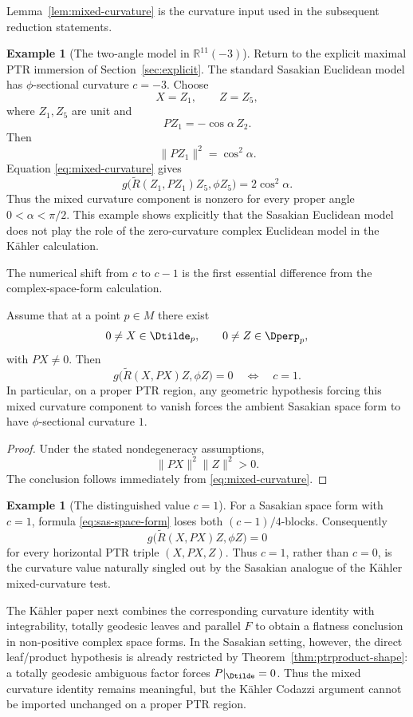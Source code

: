 \documentclass[11pt]{article}
\theoremstyle{definition}\newtheorem{definition}[theorem]{Definition}\newtheorem{example}[theorem]{Example}
\theoremstyle{remark}\newtheorem{remark}[theorem]{Remark}
\begin{document}
Lemma~\ref{lem:mixed-curvature} is the curvature input used in the
subsequent reduction statements.


\begin{example}[The two-angle model in $\mathbb R^{11}(-3)$]\label{ex:mixed-curvature}
Return to the explicit maximal PTR immersion of Section~\ref{sec:explicit}.  The standard Sasakian Euclidean model has $\phi$-sectional curvature $c=-3$.  Choose
\[
 X=Z_1,\qquad Z=Z_5,
\]
where $Z_1,Z_5$ are unit and
\[
 PZ_1=-\cos\alpha\,Z_2.
\]
Then
\[
 \|PZ_1\|^2=\cos^2\alpha.
\]
Equation \eqref{eq:mixed-curvature} gives
\[
 g\bigl(\widetilde R(Z_1,PZ_1)Z_5,\phi Z_5\bigr)
 =2\cos^2\alpha.
\]
Thus the mixed curvature component is nonzero for every proper angle
$0<\alpha<\pi/2$.  This example shows explicitly that the Sasakian Euclidean model does not play the role of the zero-curvature complex Euclidean model in the K\"ahler calculation.
\end{example}

The numerical shift from $c$ to $c-1$ is the first essential difference from the complex-space-form calculation.

\begin{corollary}\label{cor:c-one}
Assume that at a point $p\in M$ there exist
\[
 0\neq X\in\Dtilde_p,\qquad 0\neq Z\in\Dperp_p,
\]
with $PX\neq0$.  Then
\[
 g\bigl(\widetilde R(X,PX)Z,\phi Z\bigr)=0
 \quad\Longleftrightarrow\quad c=1.
\]
In particular, on a proper PTR region, any geometric hypothesis forcing this mixed curvature component to vanish forces the ambient Sasakian space form to have $\phi$-sectional curvature $1$.
\end{corollary}

\begin{proof}
Under the stated nondegeneracy assumptions,
\[
 \|PX\|^2\|Z\|^2>0.
\]
The conclusion follows immediately from \eqref{eq:mixed-curvature}.
\end{proof}

\begin{example}[The distinguished value $c=1$]\label{ex:c-one}
For a Sasakian space form with $c=1$, formula \eqref{eq:sas-space-form} loses both $(c-1)/4$-blocks.  Consequently
\[
 g\bigl(\widetilde R(X,PX)Z,\phi Z\bigr)=0
\]
for every horizontal PTR triple $(X,PX,Z)$.  Thus $c=1$, rather than $c=0$, is the curvature value naturally singled out by the Sasakian analogue of the K\"ahler mixed-curvature test.
\end{example}

The K\"ahler paper next combines the corresponding curvature identity with
integrability, totally geodesic leaves and parallel \(F\) to obtain a
flatness conclusion in non-positive complex space forms.  In the Sasakian
setting, however, the direct leaf/product hypothesis is already restricted
by Theorem~\ref{thm:ptrproduct-shape}: a totally geodesic ambiguous factor
forces \(P|_{\Dtilde}=0\).  Thus the mixed curvature identity remains
meaningful, but the K\"ahler Codazzi argument cannot be imported unchanged
on a proper PTR region.
\end{document}
